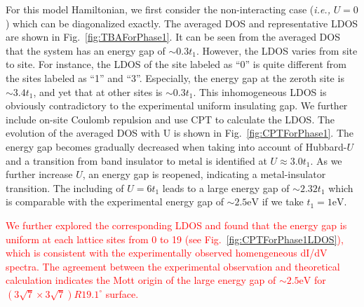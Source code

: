 \documentclass[aps,prb,amsfonts,amsmath,amssymb,showpacs,groupedaddress,superscriptaddress]{revtex4-1}
\begin{document}
For this model Hamiltonian, we first consider the non-interacting case (\textit{i.e.,} $U = 0$) which can be diagonalized exactly. The averaged DOS and representative LDOS are shown in Fig.~\ref{fig:TBAForPhase1}. It can be seen from the averaged DOS that the system has an energy gap of $\sim 0.3 t_{1}$. However, the LDOS varies from site to site. For instance, the LDOS of the site labeled as ``0'' is quite different from the sites labeled as ``1'' and ``3''. Especially, the energy gap at the zeroth site is $\sim 3.4 t_{1}$, and yet that at other sites is $\sim 0.3 t_{1}$. This inhomogeneous LDOS is obviously contradictory to the experimental uniform insulating gap. We further include on-site Coulomb repulsion and use CPT to calculate the LDOS. The evolution of the averaged DOS with U is shown in Fig.~\ref{fig:CPTForPhase1}. The energy gap becomes gradually decreased when taking into account of Hubbard-$U$ and a transition from band insulator to metal is identified at $U \approx 3.0 t_{1}$. As we further increase $U$, an energy gap is reopened, indicating a metal-insulator transition. The including of $U = 6 t_{1}$ leads to a large energy gap of $\sim 2.32 t_{1}$ which is comparable with the experimental energy gap of $\sim 2.5 \text{eV}$ if we take $t_{1} = 1\text{eV}$.

\textcolor{red}{We further explored the corresponding LDOS and found that the energy gap is uniform at each lattice sites from 0 to 19 (see Fig.~\ref{fig:CPTForPhase1LDOS}), which is consistent with the experimentally observed homengeneous dI/dV spectra. The agreement between the experimental observation and theoretical calculation indicates the Mott origin of the large energy gap of $\sim 2.5\text{eV}$ for $(3\sqrt{7} \times 3\sqrt{7})R19.1^\circ$ surface.}
\end{document}
